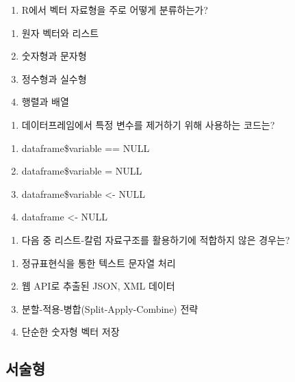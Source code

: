 \documentclass[
  letterpaper,
]{book}
\providecommand{\tightlist}{%
  \setlength{\itemsep}{0pt}\setlength{\parskip}{0pt}}\usepackage{longtable,booktabs,array}
\begin{document}
\begin{enumerate}
\def\labelenumi{\arabic{enumi}.}
\tightlist
\item
  R에서 벡터 자료형을 주로 어떻게 분류하는가?
\end{enumerate}

\begin{enumerate}
\def\labelenumi{\alph{enumi})}
\tightlist
\item
  원자 벡터와 리스트
\item
  숫자형과 문자형
\item
  정수형과 실수형
\item
  행렬과 배열
\end{enumerate}

\begin{enumerate}
\def\labelenumi{\arabic{enumi}.}
\setcounter{enumi}{1}
\tightlist
\item
  데이터프레임에서 특정 변수를 제거하기 위해 사용하는 코드는?
\end{enumerate}

\begin{enumerate}
\def\labelenumi{\alph{enumi})}
\tightlist
\item
  dataframe\$variable == NULL
\item
  dataframe\$variable = NULL\\
\item
  dataframe\$variable \textless- NULL
\item
  dataframe \textless- NULL
\end{enumerate}

\begin{enumerate}
\def\labelenumi{\arabic{enumi}.}
\setcounter{enumi}{2}
\tightlist
\item
  다음 중 리스트-칼럼 자료구조를 활용하기에 적합하지 않은 경우는?
\end{enumerate}

\begin{enumerate}
\def\labelenumi{\alph{enumi})}
\tightlist
\item
  정규표현식을 통한 텍스트 문자열 처리
\item
  웹 API로 추출된 JSON, XML 데이터
\item
  분할-적용-병합(Split-Apply-Combine) 전략
\item
  단순한 숫자형 벡터 저장
\end{enumerate}

\subsection*{서술형}\label{uxc11cuxc220uxd615}
\end{document}
